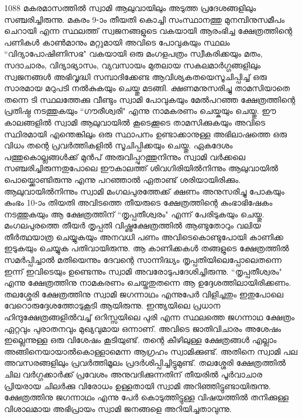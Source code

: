 \documentclass[12pt,openany]{book}
\begin{document}
	1088 മകരമാസത്തിൽ സ്വാമി ആലുവായിലും അടുത്ത പ്രദേശങ്ങളിലും സഞ്ചരിച്ചിരുന്നു. മകരം 9-ാം തീയതി കൊച്ചി സംസ്ഥാനത്തു മുനമ്പിനുസമീപം ചെറായി എന്ന സ്ഥലത്ത് സ്വജനങ്ങളുടെ വകയായി ആരംഭിച്ച ക്ഷേത്രത്തിന്റെ പണികൾ കാൺമാനും മറ്റുമായി അവിടെ പോവുകയും സ്ഥലം ``വിദ്യാപോഷിണിസഭ" വകയായി ഒരു മംഗളപത്രം സ്വീകരിക്കയും മതം, സദാചാരം, വിദ്യാഭ്യാസം, വ്യവസായം മുതലായ സകലമാർഗ്ഗങ്ങളിലും സ്വജനങ്ങൾ അഭിവൃദ്ധി സമ്പാദിക്കേണ്ട ആവിശ്യകതയെസൂചിപ്പിച്ച് ഒരു സാരമായ മറുപടി നൽകുകയും ചെയ്തു മടങ്ങി. ക്ഷണമനുസരിച്ചു താമസിയാതെ തന്നെ ടി സ്ഥലത്തേക്കു വീണ്ടും സ്വാമി പോവുകയും മേൽപറഞ്ഞ ക്ഷേത്രത്തിന്റെ പ്രതിഷ്ഠ നടത്തുകയും ``ഗൗരീശ്വരി" എന്നു നാമകരണം ചെയ്കയും ചെയ്തു. ഈ കാലങ്ങളിൽ സ്വാമി ആലുവായിൽ കൂടെക്കൂടെ താമസിക്കുകയും അവിടെ സ്ഥിരമായി എന്തെങ്കിലും ഒരു സ്ഥാപനം ഉണ്ടാക്കാനുള്ള അഭിലാഷത്തെ ഒരു വിധം തന്റെ പ്രവർത്തികളിൽ സൂചിപ്പിക്കയും ചെയ്തു. ഏകദേശം പത്തുകൊല്ലങ്ങൾക്ക് മുൻപ് അരുവിപ്പുറത്തുനിന്നും സ്വാമി വർക്കലെ സഞ്ചരിച്ചിരുന്നതുപോലെ ഈകാലത്ത് ശിവഗിരിയിൽനിന്നും ആലുവായിൽ പൊയ്ക്കൊണ്ടിരുന്നു എന്നു പറഞ്ഞാൽ ഏതാണ്ട് ശരിയായിരിക്കും. ആലുവായിൽനിന്നും സ്വാമി മംഗലപുരത്തേക്ക് ക്ഷണം അനുസരിച്ചു പോകയും കുംഭം 10-ാം തിയതി അവിടത്തെ തീയരുടെ ക്ഷേത്രത്തിന്റെ കുംഭാഭിഷേകം നടത്തുകയും ആ ക്ഷേത്രത്തിന് ``തൃപ്പതീശ്വരം" എന്ന് പേരിടുകയും ചെയ്തു. മംഗലപുരത്തെ തീയർ തൃപ്പതി വിഷ്ണുക്ഷേത്രത്തിൽ ആണ്ടുതോറും വലിയ തീർത്ഥയാത്ര ചെയ്യുകയും അനവധി പണം അവിടെകൊണ്ടുപോയി കാണിക്ക ഇടുകയും ചെയ്യുക പതിവായിരുന്നു. ആ കാണിക്കകൾ തങ്ങളുടെ ക്ഷേത്രത്തിൽ സമർപ്പിച്ചാൽ മതിയെന്നും ദേവന്റെ സാന്നിദ്ധ്യം തൃപ്പതിയിലെപ്പോലെതന്നെ ഇന്ന് ഇവിടെയും ഉണ്ടെന്നും സ്വാമി അവരോടുപദേശിച്ചിരുന്നു. ``തൃപ്പതീശ്വരം" എന്നു ക്ഷേത്രത്തിനു നാമകരണം ചെയ്തതുതന്നെ ആ ഉദ്ദേശത്തിലായിരിക്കണം. തലശ്ശേരി ക്ഷേത്രത്തിനു സ്വാമി ജഗന്നാഥം എന്നുപേർ വിളിച്ചതും ഇതുപോലെ വേറൊരുദ്ദേശത്തോടുകൂടി ആയിരുന്നു. ഇന്ത്യയിലെ പ്രധാന ഹിന്ദുക്ഷേത്രങ്ങളിൽവച്ച് ഒറിസ്സയിലെ പുരി എന്ന സ്ഥലത്തെ ജഗന്നാഥ ക്ഷേത്രം ഏറ്റവും പുരാതനവും മുഖ്യവുമായ ഒന്നാണ്. അവിടെ ജാതിവിചാരം അശേഷം ഇല്ലെന്നുള്ള ഒരു വിശേഷം കൂടിയുണ്ട്. തന്റെ കീഴിലുള്ള ക്ഷേത്രങ്ങൾ എല്ലാം അങ്ങിനെയായാൽകൊള്ളാമെന്ന ആഗ്രഹം സ്വാമിക്കുണ്ട്. അതിനെ സ്വാമി പല അവസരങ്ങളിലും പ്രവർത്തിമൂലം പ്രദർശിപ്പിച്ചിട്ടുമുണ്ട്. തലശ്ശേരി ക്ഷേത്രത്തിൽ ചില വർഗ്ഗക്കാർക്ക് പ്രവേശം അനുവദിക്കുന്നതിന് തീയരിൽ പൂർവാചാര പ്രിയരായ ചിലർക്കു വിരോധം ഉള്ളതായി സ്വാമി അറിഞ്ഞിട്ടുണ്ടായിരുന്നു. ക്ഷേത്രത്തിനു ജഗന്നാഥം എന്നു പേർ കൊടുത്തിട്ടുള്ള വിഷയത്തിൽ തനിക്കുള്ള വിശാലമായ അഭിപ്രായം സ്വാമി ജനങ്ങളെ അറിയിച്ചതാവുന്നു.
	
\end{document}
